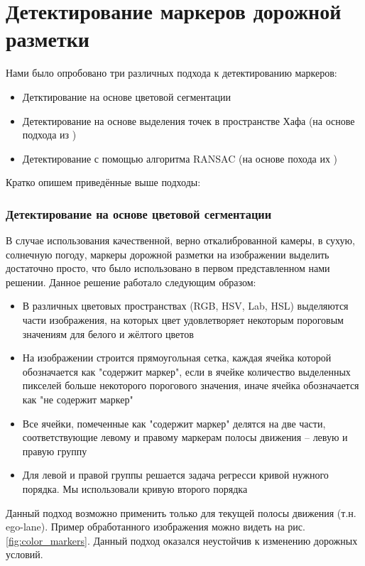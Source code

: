 \documentclass[aps,%
14pt,%
final,%
oneside,
onecolumn,%
musixtex, %
superscriptaddress,%
centertags]{extarticle} %
\begin{document}
\section{ Детектирование маркеров дорожной разметки }
Нами было опробовано три различных подхода к детектированию маркеров:
\begin{itemize}
    \item Детктирование на основе цветовой сегментации
    \item Детектирование на основе выделения точек в пространстве Хафа (на основе подхода из \cite{song2017real} )
    \item Детектирование с помощью алгоритма RANSAC (на основе похода их \cite{aly2008real} )
\end{itemize}

Кратко опишем приведённые выше подходы:

\subsubsection*{Детектирование на основе цветовой сегментации}

В случае использования качественной, верно откалиброванной камеры, в сухую, солнечную погоду, маркеры дорожной разметки на изображении выделить достаточно просто, что было использовано в первом представленном нами решении. Данное решение работало следующим образом:
\begin{itemize}
    \item В различных цветовых пространствах (RGB, HSV, Lab, HSL) выделяются части изображения, на которых цвет удовлетворяет некоторым пороговым значениям для белого и жёлтого цветов
    \item На изображении строится прямоугольная сетка, каждая ячейка которой обозначается как "содержит маркер", если в ячейке количество выделенных пикселей больше некоторого порогового значения, иначе ячейка обозначается как "не содержит маркер"
    \item Все ячейки, помеченные как "содержит маркер" делятся на две части, соответствующие левому и правому маркерам полосы движения -- левую и правую группу
    \item Для левой и правой группы решается задача регресси кривой нужного порядка. Мы использовали кривую второго порядка
\end{itemize}

Данный подход возможно применить только для текущей полосы движения (т.н. ego-lane). Пример обработанного изображения можно видеть на рис. \ref{fig:color_markers}. Данный подход оказался неустойчив к изменению дорожных условий.
\end{document}
